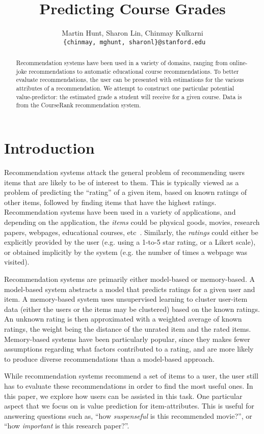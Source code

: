 \documentclass{article} %
\title{Predicting Course Grades}
\author{
Martin Hunt, Sharon Lin, Chinmay Kulkarni \\
\texttt{ \{chinmay, mghunt, sharonl\}@stanford.edu}
}
\begin{document}
\maketitle

\begin{abstract}
Recommendation systems have been used in a variety of domains, ranging from online-joke recommendations to automatic educational course recommendations.
To better evaluate recommendations, the user can be presented with estimations for the various attributes of a recommendation. We attempt to construct one particular potential value-predictor: the estimated grade a student will receive for a given course. Data is from the CourseRank recommendation system.
\end{abstract}

\section{Introduction}
\label{sec:intro}
Recommendation systems attack the general problem of recommending users items that are likely to be of interest to them. This is typically viewed as a problem of predicting the ``rating'' of a given item, based on known ratings of other items, followed by finding items that have the highest ratings. Recommendation systems have been used in a variety of applications, and depending on the application, the \textit{items} could be physical goods, movies, research papers, webpages, educational courses, etc~\cite{schafer1999recommender}. Similarly, the \textit{ratings} could either be explicitly provided by the user (e.g. using a 1-to-5 star rating, or a Likert scale), or obtained implicitly by the system (e.g. the number of times a webpage was visited).

Recommendation systems are primarily either model-based or memory-based. A model-based system abstracts a model that predicts ratings for a given user and item. A memory-based system uses unsupervised learning to cluster user-item data (either the users or the items may be clustered) based on the known ratings. An unknown rating is then approximated with a weighted average of known ratings, the weight being the distance of the unrated item and the rated items. Memory-based systems have been particularly popular, since they makes fewer assumptions regarding what factors contributed to a rating, and are more likely to produce diverse recommendations than a model-based approach. 

While recommendation systems recommend a set of items to a user, the user still has to evaluate these recommendations in order to find the most useful ones. In this paper, we explore how users can be assisted in this task. One particular aspect that we focus on is value prediction for item-attributes. This is useful for answering questions such as, ``how \textit{suspenseful} is this recommended movie?'', or ``how \textit{important} is this research paper?''. 
\end{document}
